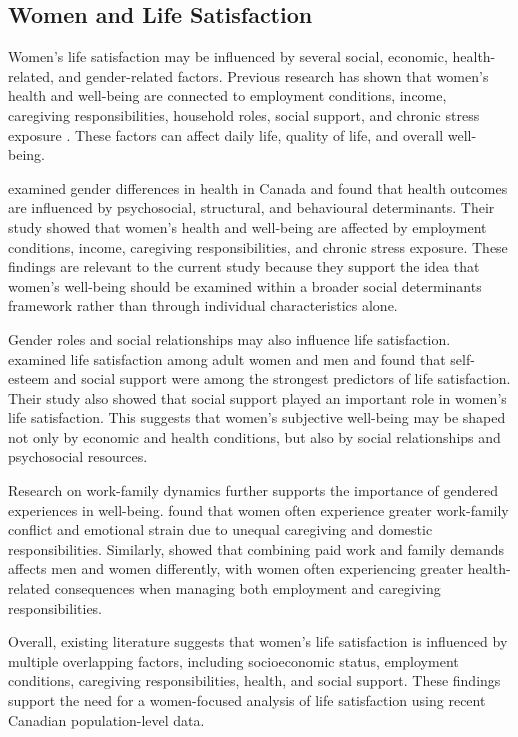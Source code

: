 \documentclass[12pt]{article}
\begin{document}
\subsection{Women and Life Satisfaction}

Women’s life satisfaction may be influenced by several social, economic, health-related, and gender-related factors. Previous research has shown that women’s health and well-being are connected to employment conditions, income, caregiving responsibilities, household roles, social support, and chronic stress exposure \citep{denton2004, matud2014, artazcoz2004, bilodeau2025}. These factors can affect daily life, quality of life, and overall well-being.

\citet{denton2004} examined gender differences in health in Canada and found that health outcomes are influenced by psychosocial, structural, and behavioural determinants. Their study showed that women’s health and well-being are affected by employment conditions, income, caregiving responsibilities, and chronic stress exposure. These findings are relevant to the current study because they support the idea that women’s well-being should be examined within a broader social determinants framework rather than through individual characteristics alone.

Gender roles and social relationships may also influence life satisfaction. \citet{matud2014} examined life satisfaction among adult women and men and found that self-esteem and social support were among the strongest predictors of life satisfaction. Their study also showed that social support played an important role in women’s life satisfaction. This suggests that women’s subjective well-being may be shaped not only by economic and health conditions, but also by social relationships and psychosocial resources.

Research on work-family dynamics further supports the importance of gendered experiences in well-being. \citet{bilodeau2025} found that women often experience greater work-family conflict and emotional strain due to unequal caregiving and domestic responsibilities. Similarly, \citet{artazcoz2004} showed that combining paid work and family demands affects men and women differently, with women often experiencing greater health-related consequences when managing both employment and caregiving responsibilities.

Overall, existing literature suggests that women’s life satisfaction is influenced by multiple overlapping factors, including socioeconomic status, employment conditions, caregiving responsibilities, health, and social support. These findings support the need for a women-focused analysis of life satisfaction using recent Canadian population-level data.
\end{document}
